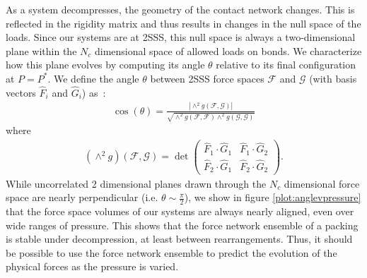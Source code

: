 As a system decompresses, the geometry of the contact network changes. This is reflected in the rigidity matrix and thus results in changes in the null space of the loads. Since our systems are at 2SSS, this null space is always a two-dimensional plane within the $N_c$ dimensional space of allowed loads on bonds. We characterize how this plane evolves by computing its angle $\theta$ relative to its final configuration at $P=P^*$. We define the angle $\theta$ between 2SSS force spaces $\mathcal{F}$ and $\mathcal{G}$ (with basis vectors $\hat F_i$ and $\hat G_i$) as~\cite{jordan_essai_1875}:
%
\begin{align}
\cos (\theta) = \frac{|\wedge^2 g(\mathcal{F}, \mathcal{G})|}{\sqrt{ \wedge^2 g (\mathcal{F},\mathcal{F}) \wedge^2 g(\mathcal{G},\mathcal{G})}}
\end{align}
where
\begin{align}
(\wedge^2 g) (\mathcal{F}, \mathcal{G}) = \det\begin{pmatrix} \hat F_1 \cdot \hat G_1 & \hat F_1 \cdot \hat G_2 \\ \hat F_2 \cdot \hat G_1 & \hat F_2 \cdot \hat G_2 \end{pmatrix}.
\end{align}
%
While uncorrelated 2 dimensional planes drawn through the $N_c$ dimensional force space are nearly perpendicular (i.e. $\theta \sim \frac{\pi}{2}$), we show in figure \ref{plot:anglevpressure} that the force space volumes of our systems are always nearly aligned, even over wide ranges of pressure. This shows that the force network ensemble of a packing is stable under decompression, at least between rearrangements. Thus, it should be possible to use the force network ensemble to predict the evolution of the physical forces as the pressure is varied.

